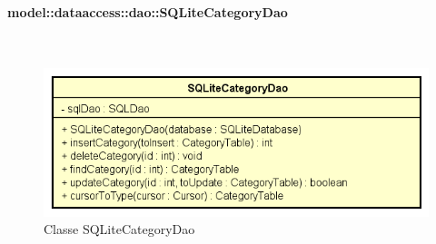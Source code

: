 \documentclass[../DefinizioneDiProdotto.tex]{subfiles}
\begin{document}
\paragraph{model::dataaccess::dao::SQLiteCategoryDao}
\
\begin{figure}[H]
	\centering
	\includegraphics[width=\maxwidth]{img/SQLiteCategoryDao.png}
	\caption{Classe SQLiteCategoryDao}\label{fig:model::dataaccess::dao::SQLiteCategoryDao} 
\end{figure}
\end{document}
